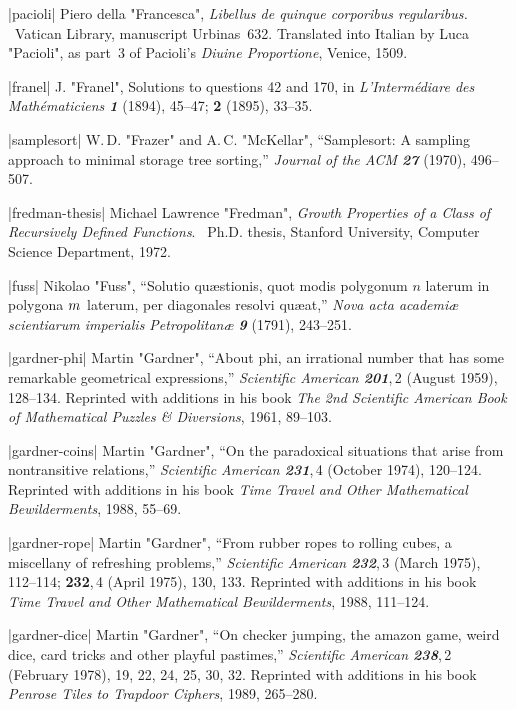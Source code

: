 \bib|pacioli|%
Piero della "Francesca", {\sl Libellus de
quinque corporibus regularibus.} \ Vatican Library, manuscript Urbinas~632.
Translated into Italian by Luca "Pacioli", as part~3 of
Pacioli's {\sl Diuine Proportione}, Venice, 1509.

\bib|franel|%
J. "Franel", Solutions to questions 42 and 170, in
{\sl L'Interm\'ediare des Math\'ematiciens\/ \bf1} (1894),
45--47; {\bf2} (1895), 33--35.

\bib|samplesort|%
W.\,D. "Frazer" and A.\,C. "McKellar", ``Samplesort: A sampling approach
to minimal storage tree sorting,''
{\sl Journal of the ACM\/ \bf27} (1970), 496--507.

\bib|fredman-thesis|%
Michael Lawrence "Fredman", {\sl Growth Properties of a Class of
Recursively Defined Functions}. \
Ph.D. thesis, Stanford University, Computer Science Department, 1972.

\bib|fuss|%
Nikolao "Fuss", ``Solutio qu\ae stionis, quot modis polygonum $n$
laterum in polygona $m\mskip1mu$ laterum, per diagonales resolvi qu{\ae}at,''
{\sl Nova acta academi{\ae} scientiarum imperialis Petropolitan{\ae}\/ \bf9}
(1791), 243--251.

\bib|gardner-phi|%
Martin "Gardner", ``About phi, an irrational number that has some
remarkable geometrical expressions,''
{\sl Scientific American\/ \bf201},\,2 (August 1959), 128--134. Reprinted
with additions
in his book {\sl The 2nd Scientific American Book of Mathematical Puzzles
\& Diversions}, 1961, 89--103.

\bib|gardner-coins|%
Martin "Gardner", ``On the paradoxical situations that arise from nontransitive
relations,'' {\sl Scientific American\/ \bf231},\,4
(October 1974), 120--124. Reprinted with additions
in his book {\sl Time Travel
and Other Mathematical Bewilderments}, 1988, 55--69.

\bib|gardner-rope|%
Martin "Gardner", ``From rubber ropes to rolling cubes, a miscellany of
refreshing problems,'' {\sl Scientific American\/ \bf232},\,3
(March 1975), 112--114; {\bf232},\,4 (April 1975), 130, 133.
 Reprinted with additions in his book {\sl Time Travel
and Other Mathematical Bewilderments}, 1988, 111--124.

\bib|gardner-dice|%
Martin "Gardner", ``On checker jumping, the amazon game, weird dice, card
tricks and other playful pastimes,'' {\sl Scientific American\/ \bf238},\,2
(February 1978), 19, 22, 24, 25, 30, 32.
Reprinted with additions in his book {\sl Penrose Tiles to Trapdoor Ciphers},
1989, 265--280.

